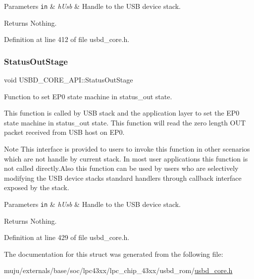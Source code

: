 \begin{DoxyParams}[1]{Parameters}
\mbox{\tt in}  & {\em h\+Usb} & Handle to the U\+SB device stack. \\
\hline
\end{DoxyParams}
\begin{DoxyReturn}{Returns}
Nothing. 
\end{DoxyReturn}


Definition at line 412 of file usbd\+\_\+core.\+h.

\mbox{\label{struct_u_s_b_d___c_o_r_e___a_p_i_aefbfebfc97c53ff2d5030fdd44dbec7e}} 
\subsubsection{\texorpdfstring{Status\+Out\+Stage}{StatusOutStage}}
{\footnotesize\ttfamily void U\+S\+B\+D\+\_\+\+C\+O\+R\+E\+\_\+\+A\+P\+I\+::\+Status\+Out\+Stage}

Function to set E\+P0 state machine in status\+\_\+out state.

This function is called by U\+SB stack and the application layer to set the E\+P0 state machine in status\+\_\+out state. This function will read the zero length O\+UT packet received from U\+SB host on E\+P0. ~\newline
\begin{DoxyNote}{Note}
This interface is provided to users to invoke this function in other scenarios which are not handle by current stack. In most user applications this function is not called directly.\+Also this function can be used by users who are selectively modifying the U\+SB device stack\textquotesingle{}s standard handlers through callback interface exposed by the stack.
\end{DoxyNote}

\begin{DoxyParams}[1]{Parameters}
\mbox{\tt in}  & {\em h\+Usb} & Handle to the U\+SB device stack. \\
\hline
\end{DoxyParams}
\begin{DoxyReturn}{Returns}
Nothing. 
\end{DoxyReturn}


Definition at line 429 of file usbd\+\_\+core.\+h.



The documentation for this struct was generated from the following file\+:\begin{DoxyCompactItemize}
\item 
muju/externals/base/soc/lpc43xx/lpc\+\_\+chip\+\_\+43xx/usbd\+\_\+rom/\hyperlink{usbd__core_8h}{usbd\+\_\+core.\+h}\end{DoxyCompactItemize}
